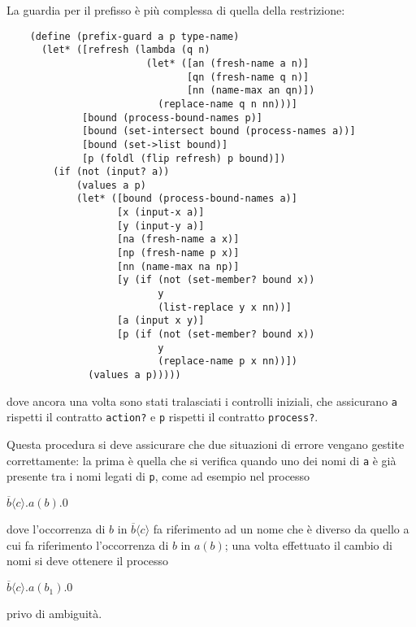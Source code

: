 La guardia per il prefisso \`e pi\`u complessa di quella della
restrizione:

\begin{lstlisting}
    (define (prefix-guard a p type-name)
      (let* ([refresh (lambda (q n)
                        (let* ([an (fresh-name a n)]
                               [qn (fresh-name q n)]
                               [nn (name-max an qn)])
                          (replace-name q n nn)))]
             [bound (process-bound-names p)]
             [bound (set-intersect bound (process-names a))]
             [bound (set->list bound)]
             [p (foldl (flip refresh) p bound)])
        (if (not (input? a))
            (values a p)
            (let* ([bound (process-bound-names a)]
                   [x (input-x a)]
                   [y (input-y a)]
                   [na (fresh-name a x)]
                   [np (fresh-name p x)]
                   [nn (name-max na np)]
                   [y (if (not (set-member? bound x))
                          y
                          (list-replace y x nn))]
                   [a (input x y)]
                   [p (if (not (set-member? bound x))
                          y
                          (replace-name p x nn))])
              (values a p)))))
\end{lstlisting}

dove ancora una volta sono stati tralasciati i controlli iniziali, che
assicurano \lstinline{a} rispetti il contratto \lstinline{action?} e
\lstinline{p} rispetti il contratto \lstinline{process?}.

Questa procedura si deve assicurare che due situazioni di errore vengano
gestite correttamente: la prima \`e quella che si verifica quando uno dei
nomi di \lstinline{a} \`e gi\`a presente tra i nomi legati di
\lstinline{p}, come ad esempio nel processo

\begin{pilisting}
$
    \overline{b}\langle c\rangle.a(b).0
$
\end{pilisting}

dove l'occorrenza di $b$ in $\overline{b}\langle c\rangle$ fa riferimento
ad un nome che \`e diverso da quello a cui fa riferimento l'occorrenza di
$b$ in $a(b)$; una volta effettuato il cambio di nomi si deve ottenere il
processo

\begin{pilisting}
$
    \overline{b}\langle c\rangle.a(b_1).0
$
\end{pilisting}

privo di ambiguit\`a.

